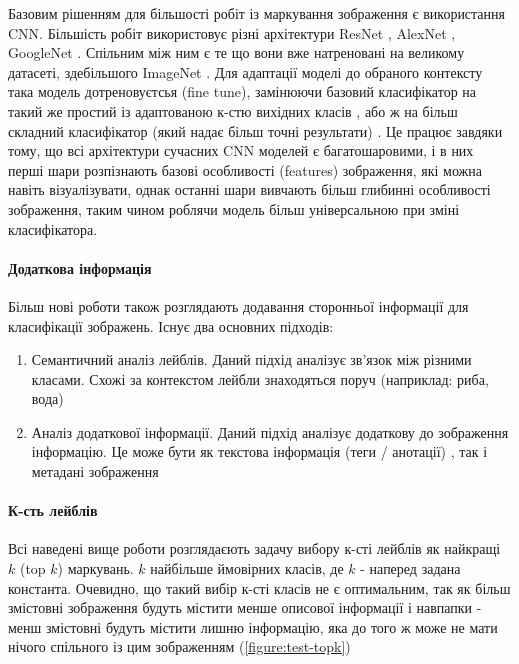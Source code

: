 \documentclass{udstu}
\begin{document}
Базовим рішенням для більшості робіт із маркування зображення є використання CNN.
Більшість робіт використовує різні архітектури ResNet \cite{resnet}, AlexNet \cite{alexnet}, GoogleNet \cite{googlenet}.
Спільним між ним є те що вони вже натреновані на великому датасеті, здебільшого ImageNet \cite{deng2009imagenet}.
Для адаптації моделі до обраного контексту така модель дотреновуєтсья (fine tune), замінюючи базовий класифікатор на
такий же простий із адаптованою к-стю вихідних класів \cite{cnn-labeling-1}, або ж на більш складний класифікатор (який надає більш точні результати) \cite{cnn-labeling-2}. Це працює завдяки тому, що всі архітектури сучасних CNN моделей є багатошаровими,
і в них перші шари розпізнають базові особливості (features) зображення, які можна навіть візуалізувати, однак
останні шари вивчають більш глибинні особливості зображення, таким чином роблячи модель більш універсальною при зміні
класифікатора.

\paragraph{\textbf{Додаткова інформація}\\}

Більш нові роботи також розглядають додавання сторонньої інформації для класифікації зображень.
Існує два основних підходів:

\begin{enumerate}
	\item Семантичний аналіз лейблів.
	Даний підхід аналізує зв'язок між різними класами.
	Схожі за контекстом лейбли знаходяться поруч (наприклад: риба, вода)
	\cite{cnn-semantic-1, cnn-semantic-2}
	\item Аналіз додаткової інформації.
	Даний підхід аналізує додаткову до зображення інформацію.
	Це може бути як текстова інформація (теги / анотації) \cite{cnn-side-2},
	так і метадані зображення \cite{cnn-side-1,cnn-side-3}
\end{enumerate}

\paragraph{\textbf{К-сть лейблів}\\}

Всі наведені вище роботи розглядаєють задачу вибору к-сті лейблів як найкращі $k$ (top $k$) маркувань.
$k$ найбільше ймовірних класів, де $k$ - наперед задана константа. Очевидно, що такий вибір к-сті класів не є
оптимальним, так як більш змістовні зображення будуть містити менше описової інформації і навпапки - менш змістовні будуть
містити лишню інформацію, яка до того ж може не мати нічого спільного із цим зображенням (\figurename{\ref{figure:test-topk}})
\end{document}
